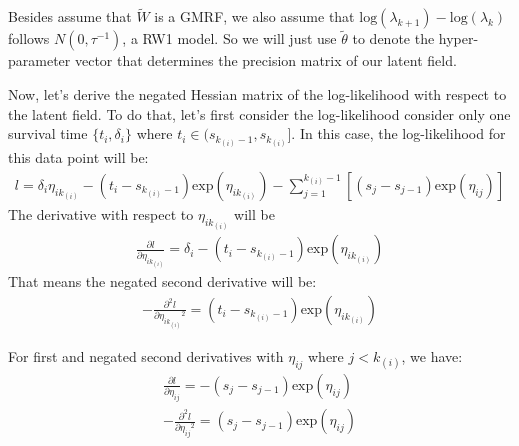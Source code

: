 \documentclass[]{article}
\begin{document}
Besides assume that \(\tilde W\) is a GMRF, we also assume that
\(\text{log}(\lambda_{k+1})-\text{log}(\lambda_k)\) follows
\(N(0,\tau^{-1})\), a RW1 model. So we will just use \(\tilde \theta\)
to denote the hyper-parameter vector that determines the precision
matrix of our latent field.

Now, let's derive the negated Hessian matrix of the log-likelihood with
respect to the latent field. To do that, let's first consider the
log-likelihood consider only one survival time \(\{t_i,\delta_i\}\)
where \(t_i \in (s_{k_{(i)}-1},s_{k_{(i)}}]\). In this case, the
log-likelihood for this data point will be:
\begin{equation}\begin{aligned}\label{eqn:loglikeagain}
l = \delta_i \eta_{ik_{(i)}} - (t_i-s_{k_{(i)}-1})\text{exp}(\eta_{ik_{(i)}})-\sum_{j=1}^{k_{(i)}-1} [(s_{j}-s_{j-1})\text{exp}(\eta_{ij})]
\end{aligned}\end{equation} The derivative with respect to
\(\eta_{ik_{(i)}}\) will be\\
\begin{equation}\begin{aligned}\label{eqn:hessian}
\frac{\partial l}{\partial \eta_{ik_{(i)}}}= \delta_i -(t_i-s_{k_{(i)}-1})\text{exp}(\eta_{ik_{(i)}})
\end{aligned}\end{equation} That means the negated second derivative
will be: \begin{equation}\begin{aligned}\label{eqn:hessian1}
-\frac{\partial^2 l}{\partial {\eta_{ik_{(i)}}}^2} = (t_i-s_{k_{(i)}-1})\text{exp}(\eta_{ik_{(i)}})
\end{aligned}\end{equation}

For first and negated second derivatives with \(\eta_{ij}\) where
\(j<k_{(i)}\), we have:
\begin{equation}\begin{aligned}\label{eqn:hessian2}
\frac{\partial l}{\partial \eta_{ij}}= -(s_{j}-s_{j-1})\text{exp}(\eta_{ij})\\
-\frac{\partial^2 l}{\partial {\eta_{ij}}^2} = (s_{j}-s_{j-1})\text{exp}(\eta_{ij})
\end{aligned}\end{equation}
\end{document}
